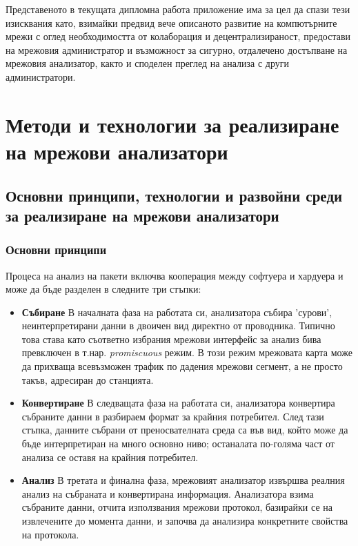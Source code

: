 \documentclass[12pt,a4paper,oneside]{book}
\begin{document}
Представеното в текущата дипломна работа приложение има за цел да спази тези
изисквания като, взимайки предвид вече описаното развитие на компютърните мрежи
с оглед необходимостта от колаборация и децентрализираност, предостави на
мрежовия администратор и възможност за сигурно, отдалечено достъпване на мрежовия
анализатор, както и споделен преглед на анализа с други администратори.

\justify
\chapter{Методи и технологии за реализиране на мрежови анализатори}

\section{Основни принципи, технологии и развойни среди за реализиране на мрежови
анализатори}

\subsection{Основни принципи}
Процеса на анализ на пакети включва кооперация между софтуера и хардуера и може
да бъде разделен в следните три стъпки:

\begin{itemize}
  \item
    \textbf{Събиране} В началната фаза на работата си, анализатора събира
    'сурови', неинтерпретирани данни в двоичен вид директно от проводника.
    Типично това става като съответно избрания мрежови интерфейс за анализ
    бива превключен в т.нар.  \textit{promiscuous} режим. В този режим мрежовата
    карта може да прихваща всевъзможен трафик по дадения мрежови сегмент, а не
    просто такъв, адресиран до станцията.
  \item
    \textbf{Конвертиране} В следващата фаза на работата си, анализатора
    конвертира събраните данни в разбираем формат за крайния потребител. След тази
    стъпка, данните събрани от преносвателната среда са във вид, който може да
    бъде интерпретиран на много основно ниво; останалата по-голяма част от
    анализа се оставя на крайния потребител.
  \item
    \textbf{Анализ} В третата и финална фаза, мрежовият анализатор извършва
    реалния анализ на събраната и конвертирана информация. Анализатора взима
    събраните данни, отчита използвания мрежови протокол, базирайки се на
    извлечените до момента данни, и започва да анализира конкретните свойства на
    протокола.
\end{itemize}
\end{document}
